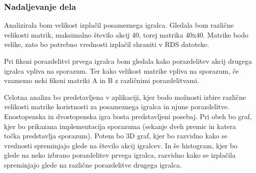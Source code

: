 \documentclass[
  12pt,
]{article}
\begin{document}
\hypertarget{nadaljevanje-dela}{%
\subsubsection{Nadaljevanje dela}\label{nadaljevanje-dela}}

Analizirala bom velikost izplačil posameznega igralca. Gledala bom
različne velikosti matrik, maksimalno število akcij 40, torej matrika
40x40. Matrike bodo velike, zato bo potrebno vrednosti izplačil shraniti
v RDS datoteke.

Pri fiksni porazdelitvi prvega igralca bom gledala kako porazdelitev
akcij drugega igralca vpliva na sporazum. Ter kako velikost matrike
vpliva na sporazum, če vzamemo neki fiksni matriki A in B z različnimi
porazdelitvami.

Celotna analiza bo predstavljena v aplikaciji, kjer bodo možnosti izbire
različne velikosti matrike koristnosti za posameznega igralca in njune
porazdelitve. Enostopenska in dvostopenska igra bosta predstavljeni
posebaj. Pri obeh bo graf, kjer bo prikazana implementacija sporazuma
(sekanje dveh premic in katera točka predstavlja sporazum). Potem bo 3D
graf, kjer bo razvidno kako se vrednosti spreminjajo glede na število
akcij igralcev. In še histogram, kjer bo glede na neko izbrano
porazdelitev prvega igralca, razvidno kako se izplačila spreminjajo
glede na različne porazdelitve drugega igralca.
\end{document}
